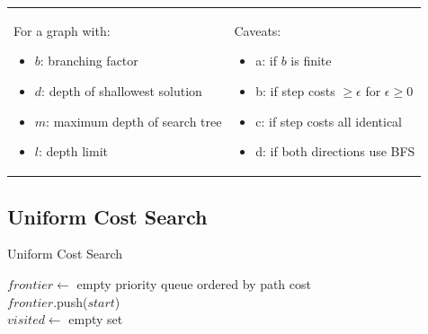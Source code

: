 \documentclass[a4paper, 12pt]{article}
\begin{document}
\vspace{0.5cm}

\begin{tabular}{p{8cm}p{7cm}}
For a graph with: \begin{itemize}
  \item $b$: branching factor
  \item $d$: depth of shallowest solution
  \item $m$: maximum depth of search tree
  \item $l$: depth limit
\end{itemize} & Caveats: \begin{itemize}
  \item a: if $b$ is finite
  \item b: if step costs $\ge\epsilon$ for $\epsilon \ge 0$
  \item c: if step costs all identical
  \item d: if both directions use BFS
\end{itemize}
\end{tabular}

  \subsection{Uniform Cost Search}

\IncMargin{2em}
\begin{algorithm}[H]
\caption{Uniform Cost Search}
\vspace{0.1cm}
\Indm
{}
\Indp
\vspace{0.1cm}
$frontier\gets$ empty priority queue ordered by path cost\\
$frontier$.push($start$)\\
$visited\gets$ empty set\\
\end{algorithm}
\DecMargin{2em}
\end{document}
